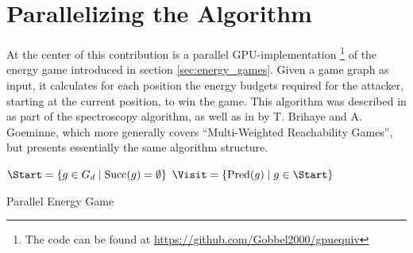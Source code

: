 \section{Parallelizing the Algorithm}

At the center of this contribution is a parallel GPU-implementation%
\footnote{The code can be found at \url{https://github.com/Gobbel2000/gpuequiv}}
of the energy game introduced in section \ref{sec:energy_games}.
Given a game graph as input, it calcu\-lates for each position the energy budgets
required for the attacker, starting at the current position, to win the game.
This algorithm was described in \cite{bisping2023process} as part of the
spectroscopy algorithm, as well as in \cite{brihaye2023multi} by T. Brihaye and
A. Goeminne, which more generally covers
\enquote{Multi-Weighted Reachability Games},
but presents essentially the same algorithm structure.

\begin{algorithm}[t] \label{alg:energy_game}
    \DontPrintSemicolon

    $\Start = \{g \in G_d \mid \mathrm{Succ}(g) = \emptyset\}$\;
    $\Visit = \{\mathrm{Pred}(g) \mid g \in \Start\}$\;

    \BlankLine
    \Return{\Energies}

    \caption{Parallel Energy Game}
\end{algorithm}

